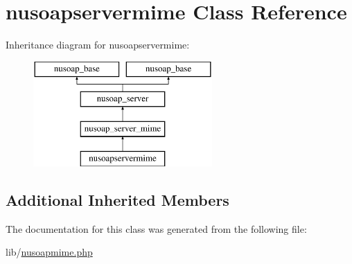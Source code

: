 \hypertarget{classnusoapservermime}{}\section{nusoapservermime Class Reference}
\label{classnusoapservermime}
Inheritance diagram for nusoapservermime\+:\begin{figure}[H]
\begin{center}
\leavevmode
\includegraphics[height=4.000000cm]{classnusoapservermime}
\end{center}
\end{figure}
\subsection*{Additional Inherited Members}


The documentation for this class was generated from the following file\+:\begin{DoxyCompactItemize}
\item 
lib/\hyperlink{nusoapmime_8php}{nusoapmime.\+php}\end{DoxyCompactItemize}
